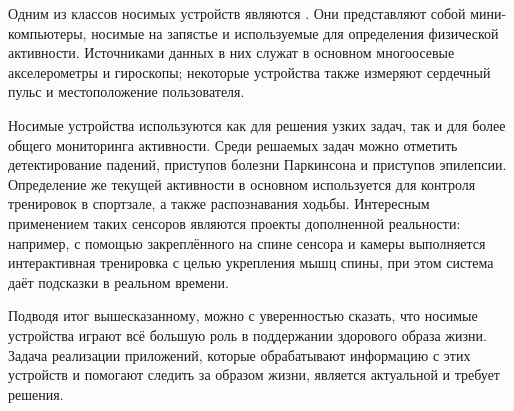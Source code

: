 Одним из классов носимых устройств являются . Они представляют собой мини-компьютеры, носимые на запястье и используемые для определения физической активности. Источниками данных в них служат в основном многоосевые акселерометры и гироскопы; некоторые устройства также измеряют сердечный пульс и местоположение пользователя. 

Носимые устройства используются как для решения узких задач, так и для более общего мониторинга активности. Среди решаемых задач можно отметить детектирование падений\cite{applications_falls}, приступов болезни Паркинсона\cite{applications_parkinson} и приступов эпилепсии\cite{applications_epileptic}. Определение же текущей активности в основном используется для контроля тренировок в спортзале, а также распознавания ходьбы. Интересным применением таких сенсоров являются проекты дополненной реальности: например, с помощью закреплённого на спине сенсора и камеры выполняется интерактивная тренировка с целью укрепления мышц спины, при этом система даёт подсказки в реальном времени\cite{applications_vr}. 

Подводя итог вышесказанному, можно с уверенностью сказать, что носимые устройства играют всё большую роль в поддержании здорового образа жизни. Задача реализации приложений, которые обрабатывают информацию с этих устройств и помогают следить за образом жизни, является актуальной и требует решения.
